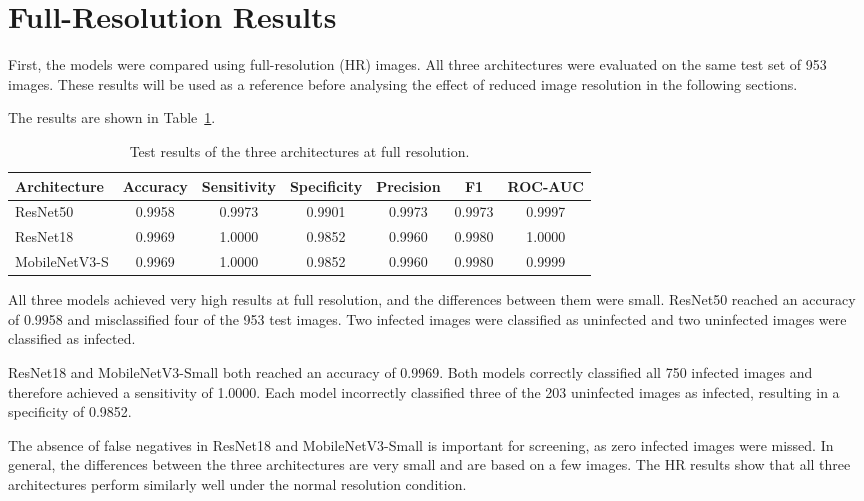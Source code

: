 \section{Full-Resolution Results}

First, the models were compared using full-resolution (HR) images. All three architectures were evaluated on the same test set of 953 images. These results will be used as a reference before analysing the effect of reduced image resolution in the following sections.

The results are shown in Table~\ref{tab:hr_results}.

\begin{table}[htbp]
    \centering
    \caption{Test results of the three architectures at full resolution.}
    \label{tab:hr_results}

    \small
    \setlength{\tabcolsep}{4pt}

    \begin{tabular}{|l|c|c|c|c|c|c|}
        \hline
        \textbf{Architecture} & \textbf{Accuracy} & \textbf{Sensitivity} &
        \textbf{Specificity} & \textbf{Precision} & \textbf{F1} &
        \textbf{ROC-AUC} \\ \hline
        ResNet50 & 0.9958 & 0.9973 & 0.9901 & 0.9973 & 0.9973 & 0.9997 \\ \hline
        ResNet18 & 0.9969 & 1.0000 & 0.9852 & 0.9960 & 0.9980 & 1.0000 \\ \hline
        MobileNetV3-S & 0.9969 & 1.0000 & 0.9852 & 0.9960 & 0.9980 & 0.9999 \\ \hline
    \end{tabular}
\end{table}

\FloatBarrier

All three models achieved very high results at full resolution, and the differences between them were small. ResNet50 reached an accuracy of 0.9958 and misclassified four of the 953 test images. Two infected images were classified as uninfected and two uninfected images were classified as infected.

ResNet18 and MobileNetV3-Small both reached an accuracy of 0.9969. Both models correctly classified all 750 infected images and therefore achieved a sensitivity of 1.0000. Each model incorrectly classified three of the 203 uninfected images as infected, resulting in a specificity of 0.9852.

The absence of false negatives in ResNet18 and MobileNetV3-Small is important for screening, as zero infected images were missed. In general, the differences between the three architectures are very small and are based on a few images. The HR results show that all three architectures perform similarly well under the normal resolution condition.

